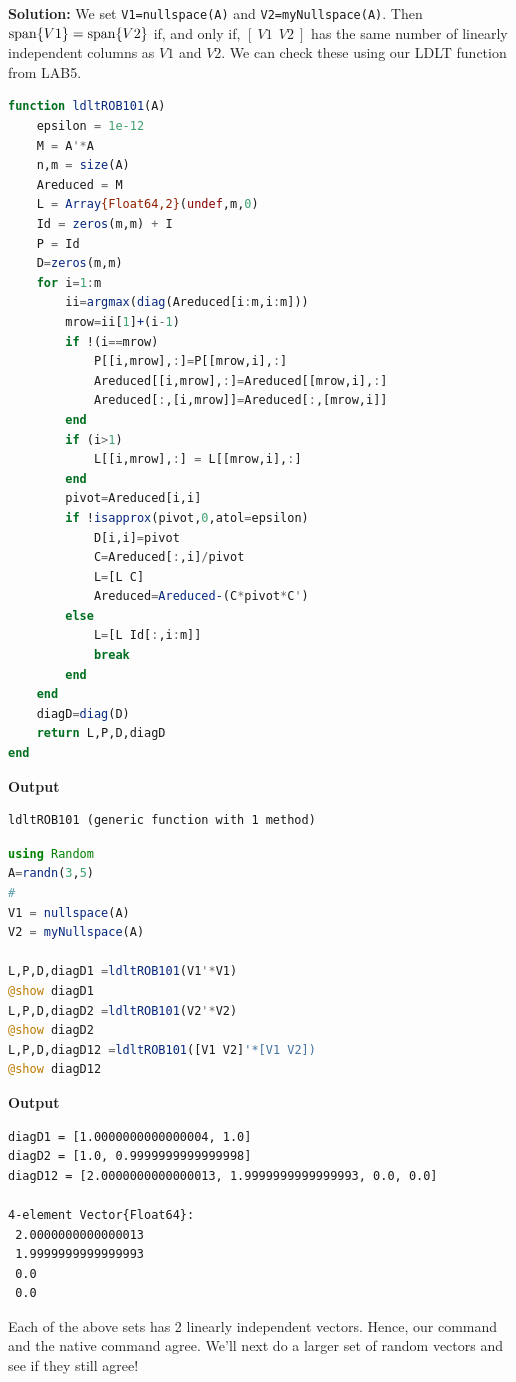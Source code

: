 \textbf{Solution:} We set \texttt{V1=nullspace(A)} and \texttt{V2=myNullspace(A)}. Then $\mathrm{span} \{ V1 \} = \mathrm{span} \{ V2 \}$ if, and only if, $[~V1~~V2~]$ has the same number of linearly independent columns as $V1$ and $V2$. We can check these using our LDLT function from LAB5.
\Qed

\begin{lstlisting}[language=Julia,style=mystyle]
function ldltROB101(A)
    epsilon = 1e-12
    M = A'*A
    n,m = size(A)
    Areduced = M
    L = Array{Float64,2}(undef,m,0)
    Id = zeros(m,m) + I
    P = Id    
    D=zeros(m,m)
    for i=1:m
        ii=argmax(diag(Areduced[i:m,i:m]))
        mrow=ii[1]+(i-1)
        if !(i==mrow)
            P[[i,mrow],:]=P[[mrow,i],:]
            Areduced[[i,mrow],:]=Areduced[[mrow,i],:]
            Areduced[:,[i,mrow]]=Areduced[:,[mrow,i]]
        end
        if (i>1)
            L[[i,mrow],:] = L[[mrow,i],:]
        end
        pivot=Areduced[i,i]
        if !isapprox(pivot,0,atol=epsilon)
            D[i,i]=pivot
            C=Areduced[:,i]/pivot
            L=[L C]
            Areduced=Areduced-(C*pivot*C')
        else
            L=[L Id[:,i:m]]
            break
        end
    end
    diagD=diag(D)
    return L,P,D,diagD
end
\end{lstlisting}
\textbf{Output} 
\begin{verbatim}
ldltROB101 (generic function with 1 method)
\end{verbatim}

\begin{lstlisting}[language=Julia,style=mystyle]
using Random
A=randn(3,5)
#
V1 = nullspace(A)
V2 = myNullspace(A)

L,P,D,diagD1 =ldltROB101(V1'*V1)
@show diagD1
L,P,D,diagD2 =ldltROB101(V2'*V2)
@show diagD2
L,P,D,diagD12 =ldltROB101([V1 V2]'*[V1 V2])
@show diagD12
\end{lstlisting}
\textbf{Output} 
\begin{verbatim}
diagD1 = [1.0000000000000004, 1.0]
diagD2 = [1.0, 0.9999999999999998]
diagD12 = [2.0000000000000013, 1.9999999999999993, 0.0, 0.0]

4-element Vector{Float64}:
 2.0000000000000013
 1.9999999999999993
 0.0
 0.0
\end{verbatim}

Each of the above sets has 2 linearly independent vectors. Hence, our command and the native command agree. We'll next do a larger set of random vectors and see if they still agree! \\

